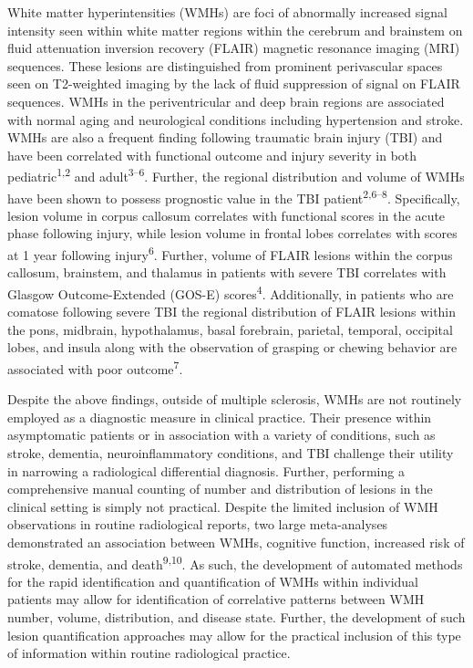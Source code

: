 \documentclass[11pt,]{article}
\begin{document}
White matter hyperintensities (WMHs) are foci of abnormally increased
signal intensity seen within white matter regions within the cerebrum
and brainstem on fluid attenuation inversion recovery (FLAIR) magnetic
resonance imaging (MRI) sequences. These lesions are distinguished from
prominent perivascular spaces seen on T2-weighted imaging by the lack of
fluid suppression of signal on FLAIR sequences. WMHs in the
periventricular and deep brain regions are associated with normal aging
and neurological conditions including hypertension and stroke. WMHs are
also a frequent finding following traumatic brain injury (TBI) and have
been correlated with functional outcome and injury severity in both
pediatric\textsuperscript{1,2} and adult\textsuperscript{3--6}. Further,
the regional distribution and volume of WMHs have been shown to possess
prognostic value in the TBI patient\textsuperscript{2,6--8}.
Specifically, lesion volume in corpus callosum correlates with
functional scores in the acute phase following injury, while lesion
volume in frontal lobes correlates with scores at 1 year following
injury\textsuperscript{6}. Further, volume of FLAIR lesions within the
corpus callosum, brainstem, and thalamus in patients with severe TBI
correlates with Glasgow Outcome-Extended (GOS-E)
scores\textsuperscript{4}. Additionally, in patients who are comatose
following severe TBI the regional distribution of FLAIR lesions within
the pons, midbrain, hypothalamus, basal forebrain, parietal, temporal,
occipital lobes, and insula along with the observation of grasping or
chewing behavior are associated with poor outcome\textsuperscript{7}.

Despite the above findings, outside of multiple sclerosis, WMHs are not
routinely employed as a diagnostic measure in clinical practice. Their
presence within asymptomatic patients or in association with a variety
of conditions, such as stroke, dementia, neuroinflammatory conditions,
and TBI challenge their utility in narrowing a radiological differential
diagnosis. Further, performing a comprehensive manual counting of number
and distribution of lesions in the clinical setting is simply not
practical. Despite the limited inclusion of WMH observations in routine
radiological reports, two large meta-analyses demonstrated an
association between WMHs, cognitive function, increased risk of stroke,
dementia, and death\textsuperscript{9,10}. As such, the development of
automated methods for the rapid identification and quantification of
WMHs within individual patients may allow for identification of
correlative patterns between WMH number, volume, distribution, and
disease state. Further, the development of such lesion quantification
approaches may allow for the practical inclusion of this type of
information within routine radiological practice.
\end{document}
